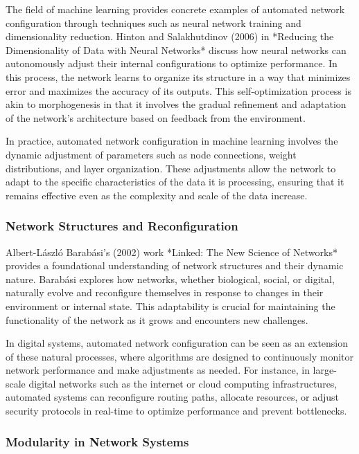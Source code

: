 \documentclass[12pt,twoside]{article}
\begin{document}
The field of machine learning provides concrete examples of automated network configuration through techniques such as neural network training and dimensionality reduction. Hinton and Salakhutdinov (2006) in *Reducing the Dimensionality of Data with Neural Networks* discuss how neural networks can autonomously adjust their internal configurations to optimize performance. In this process, the network learns to organize its structure in a way that minimizes error and maximizes the accuracy of its outputs. This self-optimization process is akin to morphogenesis in that it involves the gradual refinement and adaptation of the network’s architecture based on feedback from the environment.

In practice, automated network configuration in machine learning involves the dynamic adjustment of parameters such as node connections, weight distributions, and layer organization. These adjustments allow the network to adapt to the specific characteristics of the data it is processing, ensuring that it remains effective even as the complexity and scale of the data increase.

\subsubsection{Network Structures and Reconfiguration}

Albert-László Barabási’s (2002) work *Linked: The New Science of Networks* provides a foundational understanding of network structures and their dynamic nature. Barabási explores how networks, whether biological, social, or digital, naturally evolve and reconfigure themselves in response to changes in their environment or internal state. This adaptability is crucial for maintaining the functionality of the network as it grows and encounters new challenges.

In digital systems, automated network configuration can be seen as an extension of these natural processes, where algorithms are designed to continuously monitor network performance and make adjustments as needed. For instance, in large-scale digital networks such as the internet or cloud computing infrastructures, automated systems can reconfigure routing paths, allocate resources, or adjust security protocols in real-time to optimize performance and prevent bottlenecks.

\subsubsection{Modularity in Network Systems}
\end{document}
